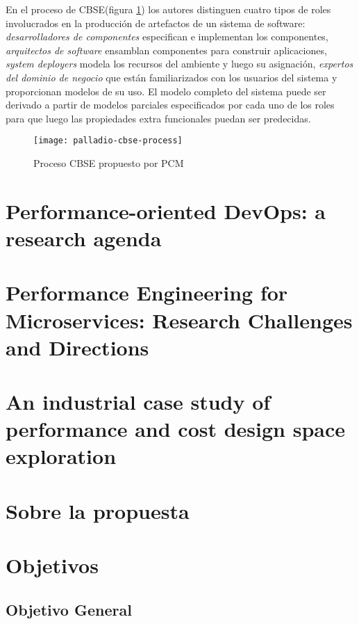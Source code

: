 En el proceso de CBSE(figura \ref{fig:palladio-cbse}) los autores distinguen cuatro tipos de roles involucrados en la producción de artefactos de un sistema de software: \emph{desarrolladores de componentes} especifican e implementan los componentes, \emph{arquitectos de software} ensamblan componentes para construir aplicaciones, \emph{system deployers} modela los recursos del ambiente y luego su asignación, \emph{expertos del dominio de negocio} que están familiarizados con los usuarios del sistema y proporcionan modelos de su uso. El modelo completo del sistema puede ser derivado a partir de modelos parciales especificados por cada uno de los roles para que luego las propiedades extra funcionales puedan ser predecidas.

\begin{figure}[h!]
  \texttt{[image: palladio-cbse-process]}
  \caption{Proceso CBSE propuesto por PCM}
  \label{fig:palladio-cbse}
\end{figure} 


\newpage
\section{Performance-oriented DevOps: a research agenda\cite{performance-devops}}


\newpage
\section{Performance Engineering for Microservices: Research Challenges and Directions\cite{microservices-challenges}}


\newpage
\section{An industrial case study of performance and cost design space exploration\cite{case-study-1}}

\newpage
\section{Sobre la propuesta}

\section{Objetivos}

\subsection{Objetivo General}

